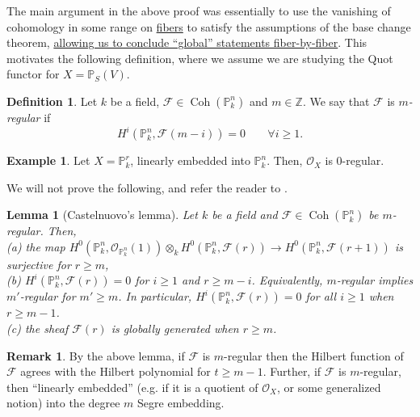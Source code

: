 \documentclass[10pt]{article}
\newtheorem{lemma}[thm]{Lemma}
\theoremstyle{definition}
\newtheorem{exmp}[thm]{Example}
\newtheorem{defn}[thm]{Definition}
\newtheorem{rmk}[thm]{Remark}
\DeclareMathOperator{\Coh}{Coh}
\newcommand{\PP}{\mathbb{P}}
\newcommand{\Z}{\mathbb{Z}}
\newcommand{\OO}{\mathcal{O}}
\begin{document}
The main argument in the above proof was essentially to use the vanishing of  cohomology in some range on \underline{fibers} to satisfy the assumptions of the base change theorem, \underline{allowing us to conclude ``global'' statements fiber-by-fiber}.  This motivates the following definition, where we assume we are studying the Quot functor for $X = \mathbb{P}_S(V)$.
\begin{defn}
Let $k$ be a field, $\mathcal{F} \in \Coh(\PP^n_k)$ and $m \in \Z$.  We say that $\mathcal{F}$ is \emph{$m$-regular} if
$$H^i(\PP^n_k, \mathcal{F}(m-i)) = 0 \;\;\;\;\;\;\; \forall i \geq 1.$$
\end{defn}


\begin{exmp}
Let $X = \mathbb{P}^r_k$, linearly embedded into $\PP^n_k$.  Then, $\OO_X$ is $0$-regular.
\end{exmp}



We will not prove the following, and refer the reader to \cite{Ni}.
\begin{lemma}[Castelnuovo's lemma]
Let $k$ be a field and $\mathcal{F} \in \Coh(\PP^n_k)$ be $m$-regular.  Then, \\
\indent (a) the map $H^0(\PP^n_k, \OO_{\PP^n_k}(1)) \otimes_k H^0(\PP^n_k, \mathcal{F}(r)) \rightarrow H^0(\PP^n_k, \mathcal{F}(r+1))$ is surjective for $r \geq m$, \\
\indent (b) $H^i(\PP^n_k, \mathcal{F}(r)) = 0$ for $i \geq 1$ and $r \geq m-i$.  Equivalently, $m$-regular implies $m'$-regular for $m' \geq m$.  In particular, $H^i(\PP^n_k, \mathcal{F}(r)) = 0$ for all $i \geq 1$ when $r \geq m-1$. \\
\indent (c) the sheaf $\mathcal{F}(r)$ is globally generated when $r \geq m$.
\end{lemma}
%

\begin{rmk}
By the above lemma, if $\mathcal{F}$ is $m$-regular then the Hilbert function of $\mathcal{F}$ agrees with the Hilbert polynomial for $t \geq m-1$.  Further, if $\mathcal{F}$ is $m$-regular, then ``linearly embedded'' (e.g. if it is a quotient of $\OO_X$, or some generalized notion) into the degree $m$ Segre embedding.
\end{rmk}
\end{document}
